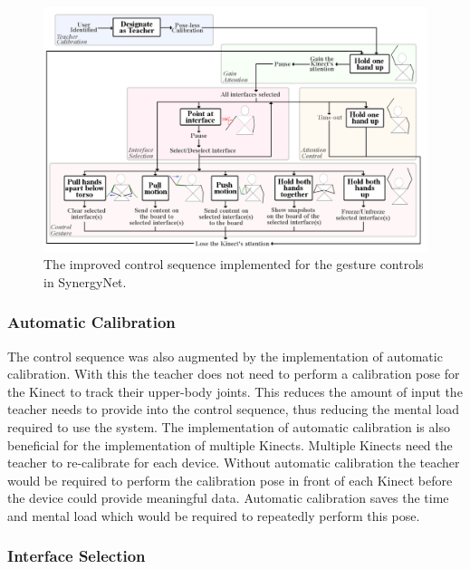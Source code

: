 \documentclass[link]{IWCOMP}
\begin{document}
\begin{figure}[t]
  \centering
  \includegraphics[width=1\textwidth]{figures/control_sequence_flow_diagram.png}
  \caption{The improved control sequence implemented for the gesture controls in SynergyNet.}
  \label{fig:controlSequenceFlowDiagram}
\end{figure}

\subsubsection{Automatic Calibration}  
\label{subsubsec:studyPhase2ImplementationAutoCalibration}

The control sequence was also augmented by the implementation of automatic calibration.
With this the teacher does not need to perform a calibration pose for the Kinect to track their upper-body joints.
This reduces the amount of input the teacher needs to provide into the control sequence, thus reducing the mental load required to use the system.
The implementation of automatic calibration is also beneficial for the implementation of multiple Kinects.
Multiple Kinects need the teacher to re-calibrate for each device.
Without automatic calibration the teacher would be required to perform the calibration pose in front of each Kinect before the device could provide meaningful data.
Automatic calibration saves the time and mental load which would be required to repeatedly perform this pose.

\subsubsection{Interface Selection}  
\label{subsubsec:studyPhase2ImplementationInterfaceSelection}
\end{document}
